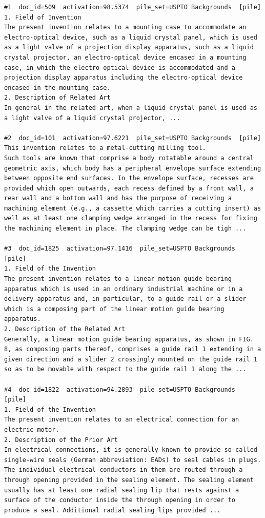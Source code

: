 \begin{verbatim}
#1  doc_id=509  activation=98.5374  pile_set=USPTO Backgrounds  [pile]
1. Field of Invention
The present invention relates to a mounting case to accommodate an electro-optical device, such as a liquid crystal panel, which is used as a light valve of a projection display apparatus, such as a liquid crystal projector, an electro-optical device encased in a mounting case, in which the electro-optical device is accommodated and a projection display apparatus including the electro-optical device encased in the mounting case.
2. Description of Related Art
In general in the related art, when a liquid crystal panel is used as a light valve of a liquid crystal projector, ...

#2  doc_id=101  activation=97.6221  pile_set=USPTO Backgrounds  [pile]
This invention relates to a metal-cutting milling tool.
Such tools are known that comprise a body rotatable around a central geometric axis, which body has a peripheral envelope surface extending between opposite end surfaces. In the envelope surface, recesses are provided which open outwards, each recess defined by a front wall, a rear wall and a bottom wall and has the purpose of receiving a machining element (e.g., a cassette which carries a cutting insert) as well as at least one clamping wedge arranged in the recess for fixing the machining element in place. The clamping wedge can be tigh ...

#3  doc_id=1825  activation=97.1416  pile_set=USPTO Backgrounds  [pile]
1. Field of the Invention
The present invention relates to a linear motion guide bearing apparatus which is used in an ordinary industrial machine or in a delivery apparatus and, in particular, to a guide rail or a slider which is a composing part of the linear motion guide bearing apparatus.
2. Description of the Related Art
Generally, a linear motion guide bearing apparatus, as shown in FIG. 8, as composing parts thereof, comprises a guide rail 1 extending in a given direction and a slider 2 crossingly mounted on the guide rail 1 so as to be movable with respect to the guide rail 1 along the ...

#4  doc_id=1822  activation=94.2893  pile_set=USPTO Backgrounds  [pile]
1. Field of the Invention
The present invention relates to an electrical connection for an electric motor.
2. Description of the Prior Art
In electrical connections, it is generally known to provide so-called single-wire seals (German abbreviation: EADs) to seal cables in plugs. The individual electrical conductors in them are routed through a through opening provided in the sealing element. The sealing element usually has at least one radial sealing lip that rests against a surface of the conductor inside the through opening in order to produce a seal. Additional radial sealing lips provided ...


\end{verbatim}

